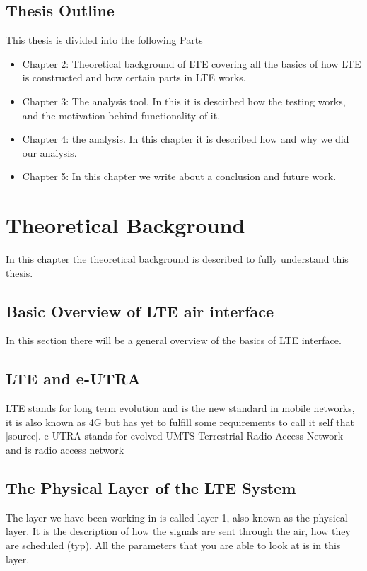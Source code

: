 \documentclass[cropmarks, frame, english]{idamasterthesis}
\begin{document}
\section{Thesis Outline}
This thesis is divided into the following Parts
\begin{itemize}
   \item Chapter 2: Theoretical background of LTE covering all the basics of how LTE is constructed and how certain parts in LTE works.
   \item Chapter 3: The analysis tool. In this it is descirbed how the testing works, and the motivation behind functionality of it.
   \item Chapter 4: the analysis. In this chapter it is described how and why we did our analysis.
   \item Chapter 5: In this chapter we write about a conclusion and future work.
\end{itemize}






















\chapter{Theoretical Background} %
In this chapter the theoretical background is described to fully understand this thesis.


\section{Basic Overview of LTE air interface}
In this section there will be a general overview of the basics of LTE interface.

\section{LTE and e-UTRA}
LTE stands for long term evolution and is the new standard in mobile networks, it is also known as 4G but has yet to fulfill some requirements to call it self that [source]. e-UTRA stands for evolved UMTS Terrestrial Radio Access Network and is radio access network

\section{The Physical Layer of the LTE System}
The layer we have been working in is called layer 1, also known as the physical layer. It is the description of how the signals are sent through the air, how they are scheduled (typ). All the parameters that you are able to look at is in this layer.
\end{document}
